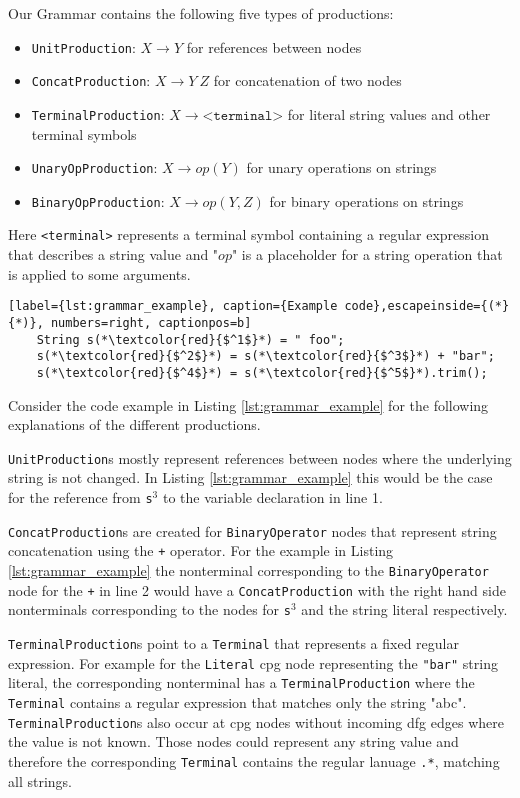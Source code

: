 Our Grammar contains the following five types of productions:
\begin{itemize}
	\item \lstinline|UnitProduction|:  $X \rightarrow Y$ for references between nodes
	\item \lstinline|ConcatProduction|: $X \rightarrow Y\ Z$ for concatenation of two nodes
	\item \lstinline|TerminalProduction|: $X \rightarrow \texttt{<terminal>}$ for literal string values and other terminal symbols
	\item \lstinline|UnaryOpProduction|: $X \rightarrow op(Y)$ for unary operations on strings
	\item \lstinline|BinaryOpProduction|: $X \rightarrow op(Y, Z)$ for binary operations on strings
\end{itemize}

Here \texttt{<terminal>} represents a terminal symbol containing a regular expression that describes a string value and "$op$" is a placeholder for a string operation that is applied to some arguments.

\begin{lstlisting}[label={lst:grammar_example}, caption={Example code},escapeinside={(*}{*)}, numbers=right, captionpos=b]
	String s(*\textcolor{red}{$^1$}*) = " foo";
	s(*\textcolor{red}{$^2$}*) = s(*\textcolor{red}{$^3$}*) + "bar";
	s(*\textcolor{red}{$^4$}*) = s(*\textcolor{red}{$^5$}*).trim();
\end{lstlisting}

Consider the code example in Listing \ref{lst:grammar_example} for the following explanations of the different productions.

\lstinline|UnitProduction|s mostly represent references between nodes where the underlying string is not changed. In Listing \ref{lst:grammar_example} this would be the case for the reference from \lstinline|s|$^3$ to the variable declaration in line 1. 

\lstinline|ConcatProduction|s are created for \lstinline|BinaryOperator| nodes that represent string concatenation using the \lstinline|+| operator. For the example in Listing \ref{lst:grammar_example} the nonterminal corresponding to the \lstinline|BinaryOperator| node for the \lstinline|+| in line 2 would have a \lstinline|ConcatProduction| with the right hand side nonterminals corresponding to the nodes for \lstinline|s|$^3$ and the string literal respectively.

\lstinline|TerminalProduction|s point to a \lstinline|Terminal| that represents a fixed regular expression.
For example for the \lstinline|Literal| \ac{cpg} node representing the \lstinline|"bar"| string literal, the corresponding nonterminal has a \lstinline|TerminalProduction| where the \lstinline|Terminal| contains a regular expression that matches only the string "abc". \lstinline|TerminalProduction|s also occur at \ac{cpg} nodes without incoming \ac{dfg} edges where the value is not known. Those nodes could represent any string value and therefore the corresponding \lstinline|Terminal| contains the regular lanuage \lstinline|.*|, matching all strings.

